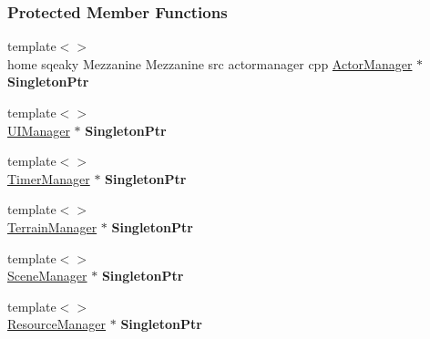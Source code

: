 \subsubsection*{Protected Member Functions}
\begin{DoxyCompactItemize}
\item 
\hypertarget{classMezzanine_1_1Singleton_acc82eb7ef63fd6ed2309244f80ca181c}{
{\footnotesize template$<$$>$ }\\home sqeaky Mezzanine Mezzanine src actormanager cpp \hyperlink{classMezzanine_1_1ActorManager}{ActorManager} $\ast$ {\bfseries SingletonPtr}}
\label{classMezzanine_1_1Singleton_acc82eb7ef63fd6ed2309244f80ca181c}

\item 
\hypertarget{classMezzanine_1_1Singleton_a3e2d258d97c4686df2a0025987148824}{
{\footnotesize template$<$$>$ }\\\hyperlink{classMezzanine_1_1UIManager}{UIManager} $\ast$ {\bfseries SingletonPtr}}
\label{classMezzanine_1_1Singleton_a3e2d258d97c4686df2a0025987148824}

\item 
\hypertarget{classMezzanine_1_1Singleton_a418516c1ec4ebe5a76f1c0a7a65b5b13}{
{\footnotesize template$<$$>$ }\\\hyperlink{classMezzanine_1_1TimerManager}{TimerManager} $\ast$ {\bfseries SingletonPtr}}
\label{classMezzanine_1_1Singleton_a418516c1ec4ebe5a76f1c0a7a65b5b13}

\item 
\hypertarget{classMezzanine_1_1Singleton_afeaf5cc8f036895d3d5613d4be3ec266}{
{\footnotesize template$<$$>$ }\\\hyperlink{classMezzanine_1_1TerrainManager}{TerrainManager} $\ast$ {\bfseries SingletonPtr}}
\label{classMezzanine_1_1Singleton_afeaf5cc8f036895d3d5613d4be3ec266}

\item 
\hypertarget{classMezzanine_1_1Singleton_a11e9a146c4058601d4a9fe8d83fd61a2}{
{\footnotesize template$<$$>$ }\\\hyperlink{classMezzanine_1_1SceneManager}{SceneManager} $\ast$ {\bfseries SingletonPtr}}
\label{classMezzanine_1_1Singleton_a11e9a146c4058601d4a9fe8d83fd61a2}

\item 
\hypertarget{classMezzanine_1_1Singleton_a137ae0a32a54dd2683caa05b772b9c52}{
{\footnotesize template$<$$>$ }\\\hyperlink{classMezzanine_1_1ResourceManager}{ResourceManager} $\ast$ {\bfseries SingletonPtr}}
\label{classMezzanine_1_1Singleton_a137ae0a32a54dd2683caa05b772b9c52}


\end{DoxyCompactItemize}

